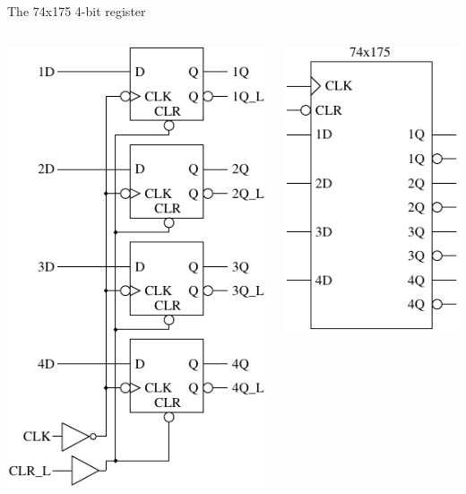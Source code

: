 \begin{frame}{The 74x175 4-bit register}
  \begin{columns}
    \begin{column}{6cm}
      \begin{center}
        \includegraphics[scale=0.7]{74x175Logic}
      \end{center}
    \end{column}
    \begin{column}{6cm}
      \begin{center}
        \includegraphics[scale=0.7]{74x175Schematic}
      \end{center}
    \end{column}
  \end{columns}
\end{frame}


